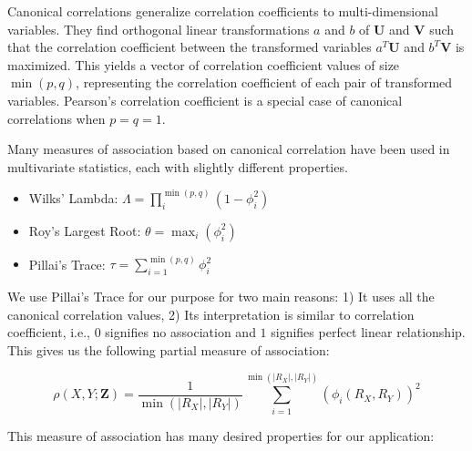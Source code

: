 \documentclass{uai2025} %
\begin{document}
Canonical correlations generalize correlation coefficients to multi-dimensional
variables. They find orthogonal linear transformations $ a $ and $ b $ of $
\bm{U} $ and $ \bm{V} $ such that the correlation coefficient between the
transformed variables $ a^T \bm{U} $ and $ b^T \bm{V} $ is maximized. This
yields a vector of correlation coefficient values of size $ \min(p, q) $,
representing the correlation coefficient of each pair of transformed variables.
Pearson's correlation coefficient is a special case of canonical correlations
when $ p = q = 1 $.

Many measures of association based on canonical correlation have been used in
multivariate statistics, each with slightly different properties.
\begin{itemize}
	\item Wilks' Lambda: $\Lambda = \prod_{i}^{\min(p, q)} (1 - \phi_i^2) $
	\item Roy's Largest Root: $ \theta = \max_i(\phi_i^2) $
	\item Pillai's Trace: $ \tau = \sum_{i=1}^{\min(p, q)} \phi_i^2 $
\end{itemize}

We use Pillai's Trace for our purpose for two main reasons: 1) It uses all the
canonical correlation values, 2) Its interpretation is similar to correlation
coefficient, i.e., $ 0 $ signifies no association and $ 1 $ signifies perfect
linear relationship. This gives us the following partial measure of
association:

\begin{equation}
	\rho(X, Y; \bm{Z}) = \frac{1}{\min(\rvert R_X \rvert, \rvert R_Y \rvert)}
	\sum_{i=1}^{\min(\rvert R_X \rvert, \rvert R_Y \rvert)} (\phi_i(R_X, R_Y))^2
\end{equation}

This measure of association has many desired properties for our application:
\end{document}
